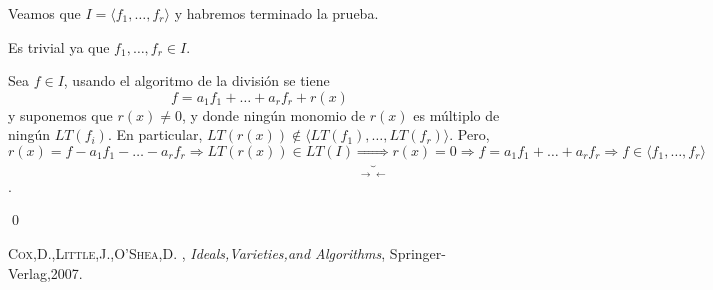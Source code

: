\documentclass{article}
\begin{document}
Veamos que $I= \langle f_1,\dots, f_r \rangle $ y habremos terminado la prueba.

\framebox{$\supseteq $} Es trivial ya que $f_1,\dots,f_r\in I$.

\framebox{$\subseteq $} Sea $f\in I$, usando el algoritmo de la división se tiene
$$ f=a_1f_1+\dots+a_rf_r+r(x)$$
y suponemos que $r(x)\neq 0$, y donde ningún monomio de $r(x)$ es múltiplo de ningún $LT(f_i)$. En particular, $LT(r(x))\not \in \langle LT(f_1),\dots,LT(f_r)\rangle $. Pero, $r(x)=f-a_1f_1-\dots - a_rf_r\Rightarrow LT(r(x))\in LT(I) \underbrace{\Rightarrow}_{\rightarrow \leftarrow}r(x)=0 \Rightarrow f=a_1f_1+\dots +a_rf_r  \Rightarrow f\in \langle f_1,\dots, f_r \rangle $. 

\qed


\begin{thebibliography}{X}
 \textsc{Cox,D.,Little,J.,O'Shea,D.} ,
\textit{Ideals,Varieties,and Algorithms}, Springer-Verlag,2007.
\end{thebibliography}
\end{document}
